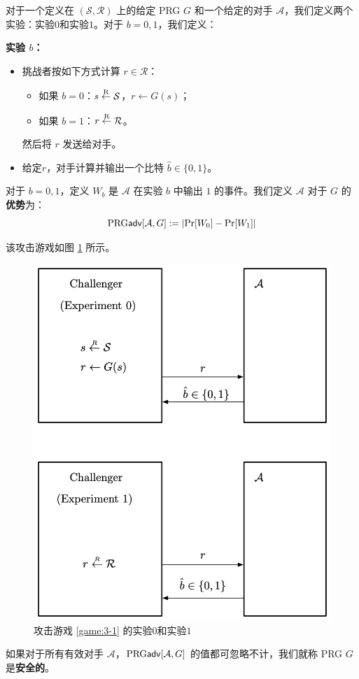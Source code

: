 \begin{game}[伪随机生成器]\label{game:3-1}
对于一个定义在 $(\mathcal{S},\mathcal{R})$ 上的给定 PRG $G$ 和一个给定的对手 $\mathcal{A}$，我们定义两个实验：实验$0$和实验$1$。对于 $b=0,1$，我们定义：

\noindent\textbf{实验 $b$：}
\begin{itemize}
	\item 挑战者按如下方式计算 $r\in\mathcal{R}$：
	\begin{itemize}
		\item 如果 $b=0$：$s\overset{\rm R}\leftarrow\mathcal{S}$，$r\leftarrow G(s)$；
		\item 如果 $b=1$：$r\overset{\rm R}\leftarrow\mathcal{R}$。
	\end{itemize}
	然后将 $r$ 发送给对手。
	\item 给定$r$，对手计算并输出一个比特 $\hat{b}\in\{0,1\}$。
\end{itemize}

对于 $b=0,1$，定义 $W_b$ 是 $\mathcal{A}$ 在实验 $b$ 中输出 $1$ 的事件。我们定义 $\mathcal{A}$ 对于 $G$ 的\textbf{优势}为：
$$
{\rm PRG\mathsf{adv}}[\mathcal{A},G]:=|{\rm Pr}[W_0]-{\rm Pr}[W_1]|
$$
\end{game}

该攻击游戏如图 \ref{fig:3-1} 所示。

\begin{figure}
  \centering
  \includegraphics[width=0.5\linewidth]{figures/chapter3/fig1.png}
  \caption{攻击游戏 \ref{game:3-1} 的实验$0$和实验$1$}
  \label{fig:3-1}
\end{figure}

\begin{definition}\label{def:3-1}
如果对于所有有效对手 $\mathcal{A}$，${\rm PRG\mathsf{adv}}[\mathcal{A},G]$ 的值都可忽略不计，我们就称 PRG $G$ 是\textbf{安全的}。

\end{definition}

